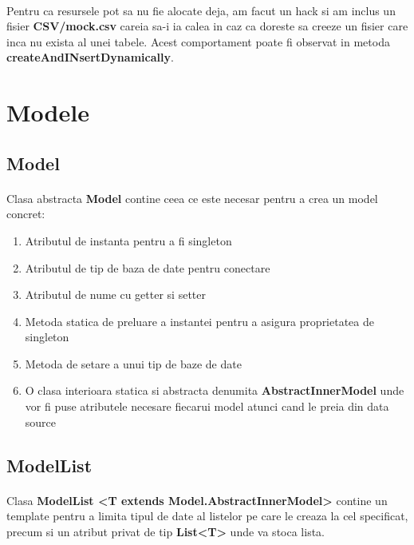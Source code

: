 \documentclass[oneside]{article}
\begin{document}
\paragraph{} Pentru ca resursele pot sa nu fie alocate deja, am facut un hack si am inclus un fisier \textbf{CSV/mock.csv} careia sa-i ia calea in caz ca doreste sa creeze un fisier care inca nu exista al unei tabele. Acest comportament poate fi observat in metoda \textbf{createAndINsertDynamically}.

\section[Modele]{Modele}
\subsection[Model]{Model}
\paragraph{}Clasa abstracta \textbf{Model} contine ceea ce este necesar pentru a crea un model concret:
\begin{enumerate}
    \item Atributul de instanta pentru a fi singleton
    \item Atributul de tip de baza de date pentru conectare
    \item Atributul de nume cu getter si setter
    \item Metoda statica de preluare a instantei pentru a asigura proprietatea de singleton
    \item Metoda de setare a unui tip de baze de date
    \item O clasa interioara statica si abstracta denumita \textbf{AbstractInnerModel} unde vor fi puse atributele necesare fiecarui model atunci cand le preia din data source
\end{enumerate}

\subsection[ModelList]{ModelList}
\paragraph{} Clasa \textbf{ModelList <T extends Model.AbstractInnerModel>} contine un template pentru a limita tipul de date al listelor pe care le creaza la cel specificat, precum si un atribut privat de tip \textbf{List<T>} unde va stoca lista.
\end{document}
